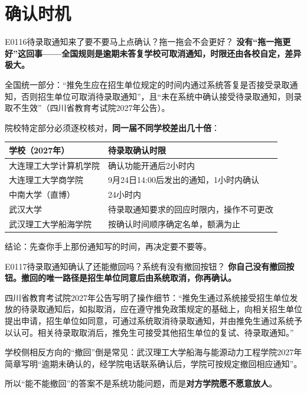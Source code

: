 \section{确认时机}
\begin{qa}{E0116}{待录取通知来了要不要马上点确认？拖一拖会不会更好？}
\textbf{没有“拖一拖更好”这回事——全国规则是逾期未答复学校可取消通知，时限还由各校自定，差异极大。}

全国统一部分：“推免生应在招生单位规定的时间内通过系统答复是否接受录取通知，否则招生单位可取消待录取通知”，且“未在系统中确认接受待录取通知，则录取不生效”（四川省教育考试院2027年公告）。

院校特定部分必须逐校核对，\textbf{同一届不同学校差出几十倍}：

\par\vspace{2pt}\nobreak\begin{center}\footnotesize
\begin{tabularx}{\textwidth}{>{\raggedright\arraybackslash}X>{\raggedright\arraybackslash}X}
\toprule
\textbf{学校（2027年）} & \textbf{待录取确认时限} \\ \midrule
大连理工大学计算机学院 & 确认功能开通后2小时内 \\
大连理工大学商学院 & 9月24日14:00后发出的通知，1小时内确认 \\
中南大学（直博） & 24小时内 \\
武汉大学 & 待录取通知要求的回应时限内，操作不可更改 \\
武汉理工大学船海学院 & 按确认时间顺序确定名单，额满为止 \\
\bottomrule
\end{tabularx}
\end{center}\vspace{2pt}\par

结论：先查你手上那份通知写的时间，再决定要不要等。
\end{qa}

\begin{qa}{E0117}{待录取通知确认了还能撤回吗？系统有没有撤回按钮？}
\textbf{你自己没有撤回按钮。撤回的唯一路径是招生单位同意后由系统取消，你再确认。}

四川省教育考试院2027年公告写明了操作细节：“推免生通过系统接受招生单位发放的待录取通知后，如拟取消，应在遵守推免政策规定的基础上，向相关招生单位提出申请，招生单位如同意，可通过系统取消待录取通知，并由推免生通过系统予以认可。相关待录取取消后，推免生可接受其他招生单位的复试、待录取通知。”

学校侧相反方向的“撤回”倒是常见：武汉理工大学船海与能源动力工程学院2027年简章写明“逾期未确认的，经学院电话联系确认后，学院可按规定撤回相应通知”。

所以“能不能撤回”的答案不是系统功能问题，而是\textbf{对方学院愿不愿意放人}。
\end{qa}

